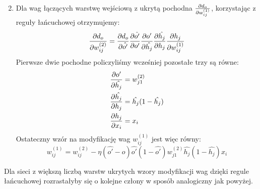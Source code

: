 \documentclass{article}
\begin{document}
\begin{enumerate}
\begin{equation}
\end{equation}
\item Dla wag łączących warstwę wejściową z ukrytą pochodna $\pdv{d_o}{w_{ij}^{(1)}}$,
korzystając z reguły łańcuchowej otrzymujemy:
\begin{equation}
	\pdv{d_o}{w_{ij}^{(2)}} = \pdv{d_o}{\hat{o'}}\pdv{\hat{o'}}{o'}\pdv{o'}{\hat{h_j}}
	                          \pdv{\hat{h_j}}{h_j}\pdv{h_j}{w_{ij}^{(1)}}
\end{equation}
Pierwsze dwie pochodne policzyliśmy wcześniej pozostałe trzy są równe:
\begin{align}
\begin{split}
	\pdv{o'}{\hat{h_j}} &= w_{j1}^{(2)} \\
	\pdv{\hat{h_j}}{h_j} &= \hat{h_j}(1 - \hat{h_j})\\
	\pdv{h_j}{x_i} &= x_i
\end{split}
\end{align}
Ostateczny wzór na modyfikację wag $w_{ij}^{(1)}$ jest więc równy:
\begin{equation}
	w_{ij}^{(1)} = w_{ij}^{(2)} - \eta (\hat{o'} - o)\hat{o'}(1 - \hat{o'})w_{j1}^{(2)}
	                                    \hat{h_j}(1 - \hat{h_j})x_i
\end{equation}
\end{enumerate}
Dla sieci z większą liczbą warstw ukrytych wzory modyfikacji wag dzięki regule łańcuchowej
rozrastałyby się o kolejne człony w sposób analogiczny jak powyżej.\\
\end{document}
